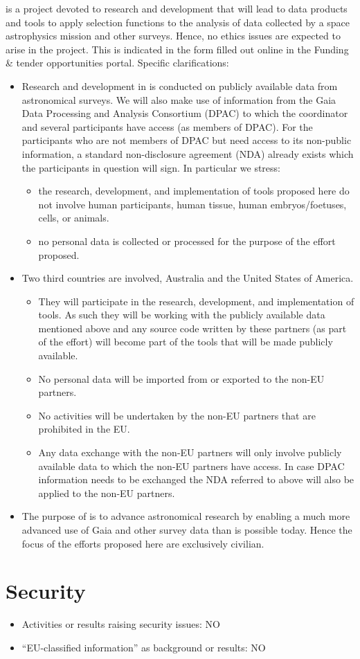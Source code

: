 {\acro} is a project devoted to research and development that will lead to data products and tools to apply selection functions to the analysis of data collected by a space astrophysics mission and other surveys. Hence, no ethics issues are expected to arise in the project. This is indicated in the form filled out online in the Funding \& tender opportunities portal. Specific clarifications:
\begin{itemize}
    \item Research and development in {\acro} is conducted on publicly available data from astronomical surveys. We will also make use of information from the Gaia Data Processing and Analysis Consortium (DPAC) to which the coordinator and several participants have access (as members of DPAC). For the participants who are not members of DPAC but need access to its non-public information, a standard non-disclosure agreement (NDA) already exists which the participants in question will sign. In particular we stress:
    \begin{itemize}
        \item the research, development, and implementation of tools proposed here do not involve human participants, human tissue, human embryos/foetuses, cells, or animals.
        \item no personal data is collected or processed for the purpose of the effort proposed.
    \end{itemize}
    \item Two third countries are involved, Australia and the United States of America.
    \begin{itemize}
        \item They will participate in the {\acro} research, development, and implementation of tools. As such they will be working with the publicly available data mentioned above and any source code written by these partners (as part of the {\acro} effort) will become part of the {\acro} tools that will be made publicly available.
        \item No personal data will be imported from or exported to the non-EU partners.
        \item No activities will be undertaken by the non-EU partners that are prohibited in the EU.
        \item Any data exchange with the non-EU partners will only involve publicly available data to which the non-EU partners have access. In case DPAC information needs to be exchanged the NDA referred to above will also be applied to the non-EU partners.
    \end{itemize}
    \item The purpose of {\acro} is to advance astronomical research by enabling a much more advanced use of Gaia and other survey data than is possible today. Hence the focus of the efforts proposed here are exclusively civilian.
\end{itemize}

\section{Security}
\label{sec:security}
\begin{itemize}
\item Activities or results raising security issues: NO
\item ``EU-classified information'' as background or results: NO
\end{itemize}

